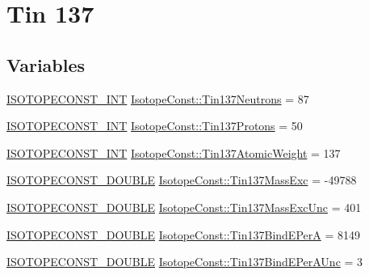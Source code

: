 \hypertarget{group___isotope_const-_tin-_sn137}{}\section{Tin 137}
\label{group___isotope_const-_tin-_sn137}
\subsection*{Variables}
\begin{DoxyCompactItemize}
\item 
\mbox{\hyperlink{group___isotope_const-_macros_ga5f18360b3e99483a35c32d789e62621c}{I\+S\+O\+T\+O\+P\+E\+C\+O\+N\+S\+T\+\_\+\+I\+NT}} \mbox{\hyperlink{group___isotope_const-_tin-_sn137_ga242ef49915b7ffe4da4850a4d5e126df}{Isotope\+Const\+::\+Tin137\+Neutrons}} = 87
\item 
\mbox{\hyperlink{group___isotope_const-_macros_ga5f18360b3e99483a35c32d789e62621c}{I\+S\+O\+T\+O\+P\+E\+C\+O\+N\+S\+T\+\_\+\+I\+NT}} \mbox{\hyperlink{group___isotope_const-_tin-_sn137_ga0f542dad81c86566aeba5839a753d3cc}{Isotope\+Const\+::\+Tin137\+Protons}} = 50
\item 
\mbox{\hyperlink{group___isotope_const-_macros_ga5f18360b3e99483a35c32d789e62621c}{I\+S\+O\+T\+O\+P\+E\+C\+O\+N\+S\+T\+\_\+\+I\+NT}} \mbox{\hyperlink{group___isotope_const-_tin-_sn137_gae0ea868e02045f4a567ae81c5ec6f932}{Isotope\+Const\+::\+Tin137\+Atomic\+Weight}} = 137
\item 
\mbox{\hyperlink{group___isotope_const-_macros_ga8f45a7272ce02c0b4c65c44636ed719a}{I\+S\+O\+T\+O\+P\+E\+C\+O\+N\+S\+T\+\_\+\+D\+O\+U\+B\+LE}} \mbox{\hyperlink{group___isotope_const-_tin-_sn137_gac974d985eed04d6febe69e7f1fde0e1f}{Isotope\+Const\+::\+Tin137\+Mass\+Exc}} = -\/49788
\item 
\mbox{\hyperlink{group___isotope_const-_macros_ga8f45a7272ce02c0b4c65c44636ed719a}{I\+S\+O\+T\+O\+P\+E\+C\+O\+N\+S\+T\+\_\+\+D\+O\+U\+B\+LE}} \mbox{\hyperlink{group___isotope_const-_tin-_sn137_ga6d196a24dfd8246892d2d2eb84bc503a}{Isotope\+Const\+::\+Tin137\+Mass\+Exc\+Unc}} = 401
\item 
\mbox{\hyperlink{group___isotope_const-_macros_ga8f45a7272ce02c0b4c65c44636ed719a}{I\+S\+O\+T\+O\+P\+E\+C\+O\+N\+S\+T\+\_\+\+D\+O\+U\+B\+LE}} \mbox{\hyperlink{group___isotope_const-_tin-_sn137_ga6517e85cb7f1a1bbeaee417bd479e09b}{Isotope\+Const\+::\+Tin137\+Bind\+E\+PerA}} = 8149
\item 
\mbox{\hyperlink{group___isotope_const-_macros_ga8f45a7272ce02c0b4c65c44636ed719a}{I\+S\+O\+T\+O\+P\+E\+C\+O\+N\+S\+T\+\_\+\+D\+O\+U\+B\+LE}} \mbox{\hyperlink{group___isotope_const-_tin-_sn137_ga274f348397badafc8d52ca94746443c1}{Isotope\+Const\+::\+Tin137\+Bind\+E\+Per\+A\+Unc}} = 3

\end{DoxyCompactItemize}
